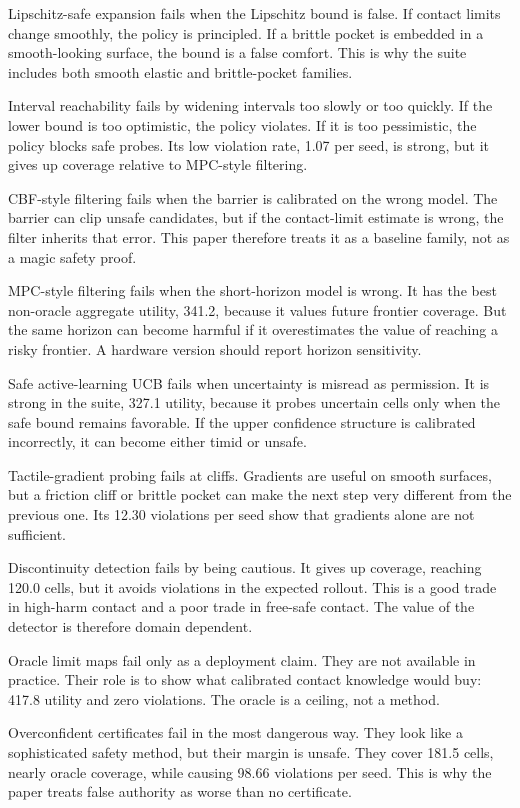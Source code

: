 \documentclass{article}
\begin{document}
Lipschitz-safe expansion fails when the Lipschitz bound is false. If contact
limits change smoothly, the policy is principled. If a brittle pocket is
embedded in a smooth-looking surface, the bound is a false comfort. This is
why the suite includes both smooth elastic and brittle-pocket families.

Interval reachability fails by widening intervals too slowly or too quickly. If
the lower bound is too optimistic, the policy violates. If it is too
pessimistic, the policy blocks safe probes. Its low violation rate, 1.07 per
seed, is strong, but it gives up coverage relative to MPC-style filtering.

CBF-style filtering fails when the barrier is calibrated on the wrong model.
The barrier can clip unsafe candidates, but if the contact-limit estimate is
wrong, the filter inherits that error. This paper therefore treats it as a
baseline family, not as a magic safety proof.

MPC-style filtering fails when the short-horizon model is wrong. It has the
best non-oracle aggregate utility, 341.2, because it values future frontier
coverage. But the same horizon can become harmful if it overestimates the
value of reaching a risky frontier. A hardware version should report horizon
sensitivity.

Safe active-learning UCB fails when uncertainty is misread as permission. It
is strong in the suite, 327.1 utility, because it probes uncertain cells only
when the safe bound remains favorable. If the upper confidence structure is
calibrated incorrectly, it can become either timid or unsafe.

Tactile-gradient probing fails at cliffs. Gradients are useful on smooth
surfaces, but a friction cliff or brittle pocket can make the next step very
different from the previous one. Its 12.30 violations per seed show that
gradients alone are not sufficient.

Discontinuity detection fails by being cautious. It gives up coverage, reaching
120.0 cells, but it avoids violations in the expected rollout. This is a good
trade in high-harm contact and a poor trade in free-safe contact. The value of
the detector is therefore domain dependent.

Oracle limit maps fail only as a deployment claim. They are not available in
practice. Their role is to show what calibrated contact knowledge would buy:
417.8 utility and zero violations. The oracle is a ceiling, not a method.

Overconfident certificates fail in the most dangerous way. They look like a
sophisticated safety method, but their margin is unsafe. They cover 181.5
cells, nearly oracle coverage, while causing 98.66 violations per seed. This
is why the paper treats false authority as worse than no certificate.
\end{document}
